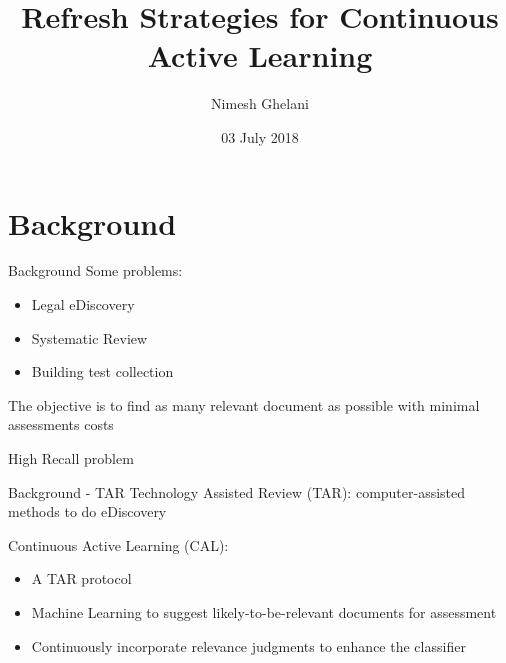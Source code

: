 \documentclass{beamer}
\title[Your Short Title]{Refresh Strategies for Continuous Active Learning}
\author{Nimesh Ghelani}
\institute{University of Waterloo}
\date{03 July 2018}
\begin{document}
\begin{frame}
  \titlepage
\end{frame}




\section{Background}
\begin{frame}{Background}
    Some problems:
    \begin{itemize}
        \item Legal eDiscovery
        \item Systematic Review
        \item Building test collection
    \end{itemize}

    \vskip 1cm
    The objective is to find as many relevant document as possible with minimal
    assessments costs

    \vskip 0.5cm
    High Recall problem
\end{frame}

\begin{frame}{Background - TAR}
    Technology Assisted Review (TAR): computer-assisted methods to do eDiscovery

    \vskip 1cm
    Continuous Active Learning (CAL):
    \begin{itemize}
        \item A TAR protocol
        \item Machine Learning to suggest likely-to-be-relevant documents for
            assessment
        \item Continuously incorporate relevance judgments to enhance the
            classifier
    \end{itemize}
\end{frame}
\end{document}
